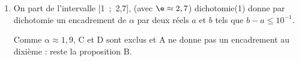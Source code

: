 \begin{enumerate}[resume]
\item %

%
%
%
%
%
%
%

On part de l'intervalle [1~;~2,7], (avec $\e \approx 2,7$)
{\ttfamily dichotomie(1)} donne par dichotomie un encadrement de $\alpha$ par deux réels $a$ et $b$ tels que $b - a \leqslant 10^{-1}$.

Comme $\alpha \approx 1,9$, C et D sont exclus et A ne donne pas un encadrement au dixième : reste la proposition B.
\end{enumerate}

